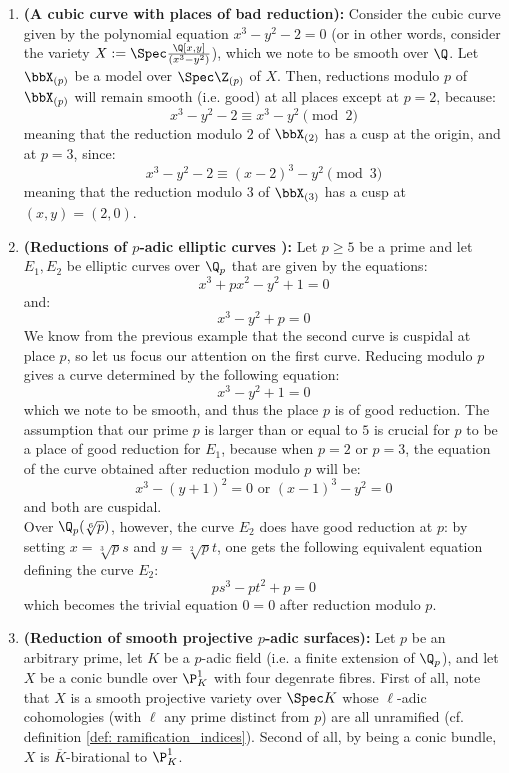         \begin{example}
            \noindent
            \begin{enumerate}
                \item \textbf{(A cubic curve with places of bad reduction):} Consider the cubic curve given by the polynomial equation $x^3 - y^2  - 2 = 0$ (or in other words, consider the variety $X := \Spec \frac{\Q[x, y]}{(x^3 - y^2)}$), which we note to be smooth over $\Q$. Let $\bbX_{(p)}$ be a model over $\Spec \Z_{(p)}$ of $X$. Then, reductions modulo $p$ of $\bbX_{(p)}$ will remain smooth (i.e. good) at all places except at $p = 2$, because:
                    $$x^3 - y^2 - 2 \equiv x^3 - y^2 \pmod{2}$$
                meaning that the reduction modulo $2$ of $\bbX_{(2)}$ has a cusp at the origin, and at $p = 3$, since:
                    $$x^3 - y^2 - 2 \equiv (x - 2)^3 - y^2 \pmod{3}$$
                meaning that the reduction modulo $3$ of $\bbX_{(3)}$ has a cusp at $(x, y) = (2, 0)$.
                \item \textbf{(Reductions of $p$-adic elliptic curves \cite[Example 5.2]{silverman_elliptic_curves}):} Let $p \geq 5$ be a prime and let $E_1, E_2$ be elliptic curves over $\Q_p$ that are given by the equations:
                    $$x^3 + px^2 - y^2 + 1 = 0$$
                and:
                    $$x^3 - y^2 + p = 0$$
                We know from the previous example that the second curve is cuspidal at place $p$, so let us focus our attention on the first curve. Reducing modulo $p$ gives a curve determined by the following equation:
                    $$x^3 - y^2 + 1 = 0$$
                which we note to be smooth, and thus the place $p$ is of good reduction. The assumption that our prime $p$ is larger than or equal to $5$ is crucial for $p$ to be a place of good reduction for $E_1$, because when $p = 2$ or $p = 3$, the equation of the curve obtained after reduction modulo $p$ will be:
                    $$\text{$x^3 - (y + 1)^2 = 0$ or $(x - 1)^3 - y^2 = 0$}$$
                and both are cuspidal.
                \\
                Over $\Q_p(\sqrt[6]{p})$, however, the curve $E_2$ does have good reduction at $p$: by setting $x = \sqrt[3]{p} s$ and $y = \sqrt[2]{p} t$, one gets the following equivalent equation defining the curve $E_2$:
                    $$ps^3 - pt^2 + p = 0$$
                which becomes the trivial equation $0 = 0$ after reduction modulo $p$. 
                \item \textbf{(Reduction of smooth projective $p$-adic surfaces):} Let $p$ be an arbitrary prime, let $K$ be a $p$-adic field (i.e. a finite extension of $\Q_p$), and let $X$ be a conic bundle over $\P^1_K$ with four degenrate fibres. First of all, note that $X$ is a smooth projective variety over $\Spec K$ whose $\ell$-adic cohomologies (with $\ell$ any prime distinct from $p$) are all unramified (cf. definition \ref{def: ramification_indices}). Second of all, by being a conic bundle, $X$ is $\overline{K}$-birational to $\P^1_K$. 

\end{enumerate}
\end{example}
